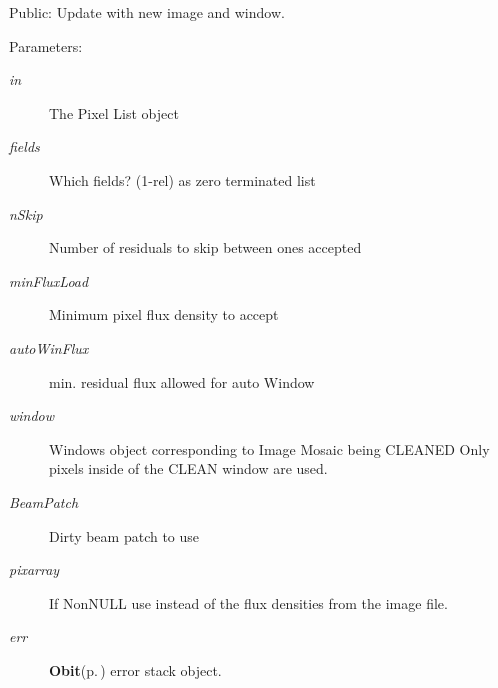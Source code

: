 Public: Update with new image and window. 

\begin{Desc}
\item[Parameters:]
\begin{description}
\item[{\em in}]The Pixel List object \item[{\em fields}]Which fields? (1-rel) as zero terminated list \item[{\em n\-Skip}]Number of residuals to skip between ones accepted \item[{\em min\-Flux\-Load}]Minimum pixel flux density to accept \item[{\em auto\-Win\-Flux}]min. residual flux allowed for auto Window \item[{\em window}]Windows object corresponding to Image Mosaic being CLEANED Only pixels inside of the CLEAN window are used. \item[{\em Beam\-Patch}]Dirty beam patch to use \item[{\em pixarray}]If Non\-NULL use instead of the flux densities from the image file. \item[{\em err}]{\bf Obit}{\rm (p.\,\pageref{structObit})} error stack object. \end{description}
\end{Desc}
